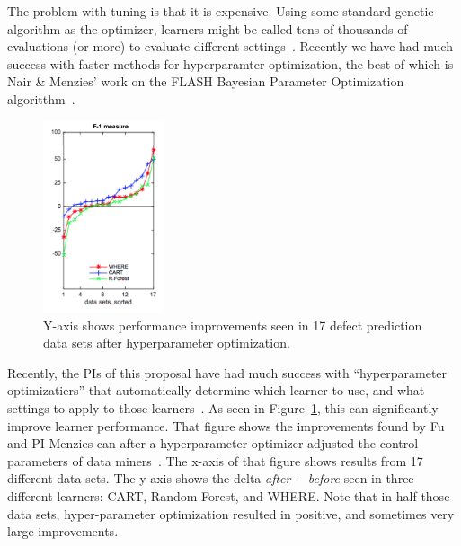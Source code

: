  

The problem with tuning is that it is expensive.
Using 
some
standard genetic algorithm as the optimizer,  learners might be called tens of thousands
of evaluations (or more)  to evaluate different settings~\cite{menzies18}.  Recently
we have had much success with faster methods for hyperparamter optimization, the best of which is Nair \& Menzies' work on the FLASH Bayesian Parameter Optimization algoritthm~\cite{nair18tse}. 


\begin{figure}
    \includegraphics[width=1.4in]{figs/f1.png}  \caption{Y-axis shows performance improvements seen in 17 defect prediction data sets after   hyperparameter optimization.}\label{fig:tuned}
\end{figure}Recently, the PIs of this proposal have had much success  with   ``hyperparameter optimizatiers'' that automatically determine which learner to use, and what settings to apply to those learners~\cite{%
fu2016tuning,%
chen2017riot,%
fu2017revisiting,%
nair2017faster,%
mathew2017shorter,%
chen2017beyond,%
nair2016accidental,%
agrawal2018wrong,%
agrawal17}.
As seen in  Figure~\ref{fig:tuned}, this can   significantly improve learner performance. That figure shows the  improvements found by Fu and PI Menzies
can after a hyperparameter optimizer adjusted the control
 parameters of data miners~\cite{fu2016tuning}. The x-axis of that figure shows results from 17 different data sets. The y-axis shows the delta 
\mbox{{\em after - before}} seen in three different
learners: CART, Random Forest, and WHERE.
Note that in half those data sets, hyper-parameter optimization
resulted in positive, and sometimes very large improvements.


